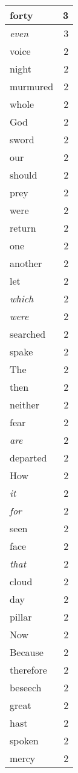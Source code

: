 \begin{center}
\begin{longtable}{l|r}
forty & 3 \\ \hline
\emph{even} & 3 \\ \hline
voice & 2 \\ \hline
night & 2 \\ \hline
murmured & 2 \\ \hline
whole & 2 \\ \hline
God & 2 \\ \hline
sword & 2 \\ \hline
our & 2 \\ \hline
should & 2 \\ \hline
prey & 2 \\ \hline
were & 2 \\ \hline
return & 2 \\ \hline
one & 2 \\ \hline
another & 2 \\ \hline
let & 2 \\ \hline
\emph{which} & 2 \\ \hline
\emph{were} & 2 \\ \hline
searched & 2 \\ \hline
spake & 2 \\ \hline
The & 2 \\ \hline
then & 2 \\ \hline
neither & 2 \\ \hline
fear & 2 \\ \hline
\emph{are} & 2 \\ \hline
departed & 2 \\ \hline
How & 2 \\ \hline
\emph{it} & 2 \\ \hline
\emph{for} & 2 \\ \hline
seen & 2 \\ \hline
face & 2 \\ \hline
\emph{that} & 2 \\ \hline
cloud & 2 \\ \hline
day & 2 \\ \hline
pillar & 2 \\ \hline
Now & 2 \\ \hline
Because & 2 \\ \hline
therefore & 2 \\ \hline
beseech & 2 \\ \hline
great & 2 \\ \hline
hast & 2 \\ \hline
spoken & 2 \\ \hline
mercy & 2 \\ \hline

\end{longtable}
\end{center}
